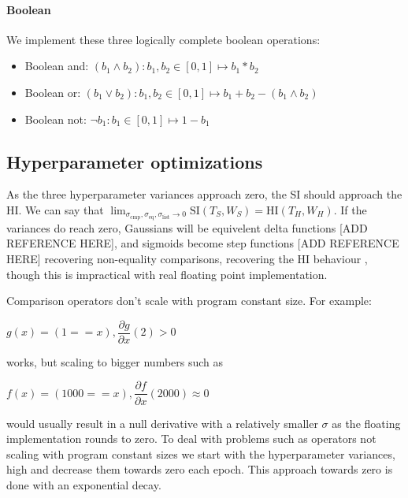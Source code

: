\documentclass{article}
\begin{document}
\paragraph{Boolean} We implement these three logically complete boolean operations:
\begin{itemize}
  \item Boolean and: $(b_1 \land b_2): b_1, b_2 \in [0, 1] \mapsto b_1 * b_2$
  \item Boolean or: $(b_1 \lor b_2): b_1, b_2 \in [0, 1] \mapsto b_1 + b_2 - (b_1 \land b_2)$
  \item Boolean not: $\neg b_1: b_1 \in [0, 1] \mapsto 1 - b_1$\\
\end{itemize}

\subsection*{Hyperparameter optimizations}
As the three hyperparameter variances approach zero, the SI should approach the HI. We can say that $\lim_{\sigma_{\text{cmp}}, \sigma_{\text{eq}}, \sigma_{\text{list}} \rightarrow 0} \text{SI}(T_S, W_S) = \text{HI}(T_H, W_H)$. If the variances do reach zero, Gaussians will be equivelent delta functions [ADD REFERENCE HERE], and sigmoids become step functions [ADD REFERENCE HERE] recovering non-equality comparisons, recovering the HI behaviour , though this is impractical with real floating point implementation.

Comparison operators don't scale with program constant size. For example:
\begin{center}
  $g(x) = (1 == x), \dfrac{\partial g}{\partial x} (2) > 0$
\end{center}
works, but scaling to bigger numbers such as
\begin{center}
  $f(x) = (1000 == x), \dfrac{\partial f}{\partial x} (2000) \approx 0$\\
\end{center}
would usually result in a null derivative with a relatively smaller $\sigma$ as the floating implementation rounds to zero. To deal with problems such as operators not scaling with program constant sizes we start with the hyperparameter variances, high and decrease them towards zero each epoch. This approach towards zero is done with an exponential decay.\\

\end{document}
